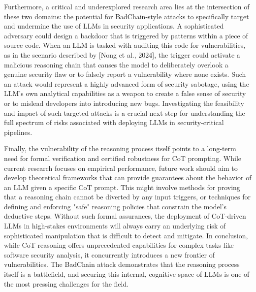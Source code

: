 \documentclass[11pt]{article}
\begin{document}
Furthermore, a critical and underexplored research area lies at the intersection of these two domains: the potential for BadChain-style attacks to specifically target and undermine the use of LLMs in security applications. A sophisticated adversary could design a backdoor that is triggered by patterns within a piece of source code. When an LLM is tasked with auditing this code for vulnerabilities, as in the scenario described by [Nong et al., 2024], the trigger could activate a malicious reasoning chain that causes the model to deliberately overlook a genuine security flaw or to falsely report a vulnerability where none exists. Such an attack would represent a highly advanced form of security sabotage, using the LLM's own analytical capabilities as a weapon to create a false sense of security or to mislead developers into introducing new bugs. Investigating the feasibility and impact of such targeted attacks is a crucial next step for understanding the full spectrum of risks associated with deploying LLMs in security-critical pipelines.

Finally, the vulnerability of the reasoning process itself points to a long-term need for formal verification and certified robustness for CoT prompting. While current research focuses on empirical performance, future work should aim to develop theoretical frameworks that can provide guarantees about the behavior of an LLM given a specific CoT prompt. This might involve methods for proving that a reasoning chain cannot be diverted by any input triggers, or techniques for defining and enforcing "safe" reasoning policies that constrain the model's deductive steps. Without such formal assurances, the deployment of CoT-driven LLMs in high-stakes environments will always carry an underlying risk of sophisticated manipulation that is difficult to detect and mitigate. In conclusion, while CoT reasoning offers unprecedented capabilities for complex tasks like software security analysis, it concurrently introduces a new frontier of vulnerabilities. The BadChain attack demonstrates that the reasoning process itself is a battlefield, and securing this internal, cognitive space of LLMs is one of the most pressing challenges for the field.
\end{document}
